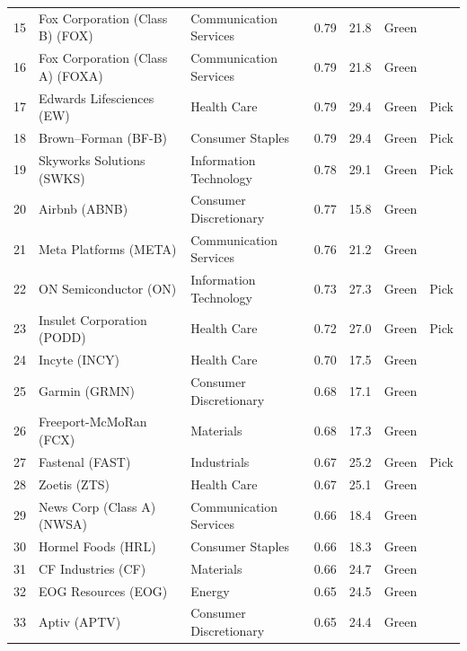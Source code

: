 \documentclass[11pt,a4paper]{article}
\begin{document}
{\begin{longtable}{r p{4.4cm} p{2.8cm} r r l l}
15 & Fox Corporation (Class B) (FOX) & Communication Services & 0.79 & 21.8 & \cellcolor[HTML]{C6EFCE}Green &  \\
16 & Fox Corporation (Class A) (FOXA) & Communication Services & 0.79 & 21.8 & \cellcolor[HTML]{C6EFCE}Green &  \\
17 & Edwards Lifesciences (EW) & Health Care & 0.79 & 29.4 & \cellcolor[HTML]{C6EFCE}Green & Pick \\
18 & Brown–Forman (BF-B) & Consumer Staples & 0.79 & 29.4 & \cellcolor[HTML]{C6EFCE}Green & Pick \\
19 & Skyworks Solutions (SWKS) & Information Technology & 0.78 & 29.1 & \cellcolor[HTML]{C6EFCE}Green & Pick \\
20 & Airbnb (ABNB) & Consumer Discretionary & 0.77 & 15.8 & \cellcolor[HTML]{C6EFCE}Green &  \\
21 & Meta Platforms (META) & Communication Services & 0.76 & 21.2 & \cellcolor[HTML]{C6EFCE}Green &  \\
22 & ON Semiconductor (ON) & Information Technology & 0.73 & 27.3 & \cellcolor[HTML]{C6EFCE}Green & Pick \\
23 & Insulet Corporation (PODD) & Health Care & 0.72 & 27.0 & \cellcolor[HTML]{C6EFCE}Green & Pick \\
24 & Incyte (INCY) & Health Care & 0.70 & 17.5 & \cellcolor[HTML]{C6EFCE}Green &  \\
25 & Garmin (GRMN) & Consumer Discretionary & 0.68 & 17.1 & \cellcolor[HTML]{C6EFCE}Green &  \\
26 & Freeport-McMoRan (FCX) & Materials & 0.68 & 17.3 & \cellcolor[HTML]{C6EFCE}Green &  \\
27 & Fastenal (FAST) & Industrials & 0.67 & 25.2 & \cellcolor[HTML]{C6EFCE}Green & Pick \\
28 & Zoetis (ZTS) & Health Care & 0.67 & 25.1 & \cellcolor[HTML]{C6EFCE}Green &  \\
29 & News Corp (Class A) (NWSA) & Communication Services & 0.66 & 18.4 & \cellcolor[HTML]{C6EFCE}Green &  \\
30 & Hormel Foods (HRL) & Consumer Staples & 0.66 & 18.3 & \cellcolor[HTML]{C6EFCE}Green &  \\
31 & CF Industries (CF) & Materials & 0.66 & 24.7 & \cellcolor[HTML]{C6EFCE}Green &  \\
32 & EOG Resources (EOG) & Energy & 0.65 & 24.5 & \cellcolor[HTML]{C6EFCE}Green &  \\
33 & Aptiv (APTV) & Consumer Discretionary & 0.65 & 24.4 & \cellcolor[HTML]{C6EFCE}Green &  \\

\end{longtable}}
\end{document}
